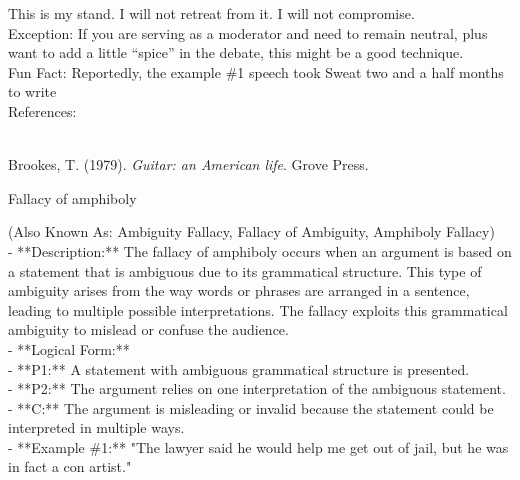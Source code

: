 \documentclass[a4paper,12pt,single,pdftex]{scrartcl}
\begin{document}
    
      This is my stand. I will not retreat from it. I will not compromise.
    \\

    
      Exception: If you are serving as a moderator and need to remain neutral, plus want to add a little “spice” in the debate, this might be a good technique.
    \\

    
      Fun Fact: Reportedly, the example \#1 speech took Sweat two and a half months to write
    \\

    References:

    
      
        
      \\

      
        
          Brookes, T. (1979). {\it Guitar: an American life}. Grove Press.
        
      
    
  

Fallacy of amphiboly
    
      (Also Known As: Ambiguity Fallacy, Fallacy of Ambiguity, Amphiboly Fallacy)
    \\

  
    
      - **Description:** The fallacy of amphiboly occurs when an argument is based on a statement that is ambiguous due to its grammatical structure. This type of ambiguity arises from the way words or phrases are arranged in a sentence, leading to multiple possible interpretations. The fallacy exploits this grammatical ambiguity to mislead or confuse the audience.
    \\

    
      - **Logical Form:**
    \\

    
        - **P1:** A statement with ambiguous grammatical structure is presented.
    \\

    
        - **P2:** The argument relies on one interpretation of the ambiguous statement.
    \\

    
        - **C:** The argument is misleading or invalid because the statement could be interpreted in multiple ways.
    \\

    
      - **Example \#1:** "The lawyer said he would help me get out of jail, but he was in fact a con artist."
    \\
\end{document}
